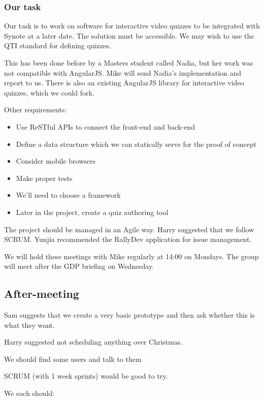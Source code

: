 \subsubsection{Our task}

Our task is to work on software for interactive video quizzes to be
integrated with Synote at a later date. The solution must be accessible.
We may wish to use the QTI standard for defining quizzes.

This has been done before by a Masters student called Nadia, but her
work was not compatible with AngularJS. Mike will send Nadia's
implementation and report to us. There is also an existing AngularJS
library for interactive video quizzes, which we could fork.

Other requirements:

\begin{itemize}
\itemsep1pt\parskip0pt
\item
  Use ReSTful APIs to connect the front-end and back-end
\item
  Define a data structure which we can statically serve for the proof of
  concept
\item
  Consider mobile browsers
\item
  Make proper tests
\item
  We'll need to choose a framework
\item
  Later in the project, create a quiz authoring tool
\end{itemize}

The project should be managed in an Agile way. Harry suggested that we
follow SCRUM. Yunjia recommended the RallyDev application for issue
management.

We will hold these meetings with Mike regularly at 14:00 on Mondays. The
group will meet after the GDP briefing on Wednesday.

\subsection{After-meeting}

Sam suggests that we create a very basic prototype and then ask whether
this is what they want.

Harry suggested not scheduling anything over Christmas.

We should find some users and talk to them

SCRUM (with 1 week sprints) would be good to try.

We each should:

